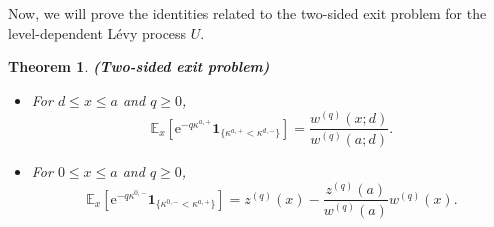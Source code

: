 \documentclass[12pt,reqno]{amsart}
\newtheorem{theorem}{Theorem}
\theoremstyle{definition}
\theoremstyle{remark}
\newcommand{\e}{\mathbb{E}}
\newcommand{\ind}{\mathbf{1}}
\newcommand{\wq}{w^{(q)}}
\begin{document}
Now, we will prove the identities related to the two-sided exit problem for the level-dependent  L\'evy process $U$.
\begin{theorem}{\textbf{(Two-sided exit problem)}}\label{th:mr.recursion_sd}
	\begin{itemize}
		\item[(i)]
		For $d \leq x\leq a$ and $q\geq 0$,
		\begin{equation}\label{main_twosided_up_sd}
		\e_x \left[ \mathrm{e}^{-q \kappa^{a,+}} \ind_{\{\kappa^{a,+}< \kappa^{d,-}\}} \right] =\frac{\wq(x;d)}{\wq(a;d)}.
		\end{equation} 		
		\item[(ii)] For $ 0 \leq x\leq a$ and $q \geq 0$,
		\begin{equation}\label{main_twosided_down_sd}
		\e_x \left[ \mathrm{e}^{-q \kappa^{0,-}} \ind_{\{\kappa^{0,-}<\kappa^{a,+}\}} \right] =z^{(q)}(x)-\frac{z^{(q)}(a)}{\wq(a)}\wq(x).
		\end{equation}
	\end{itemize}
\end{theorem}
\end{document}
